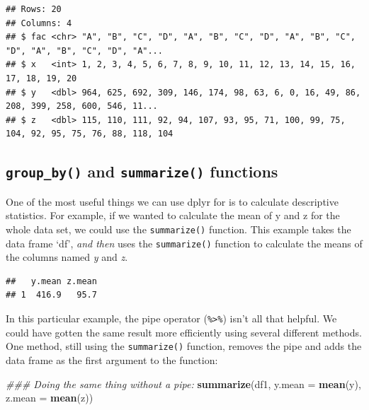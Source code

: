 \documentclass[letterpaper,]{book}
\newenvironment{Shaded}{\begin{snugshade}}{\end{snugshade}}
\newcommand{\CommentTok}[1]{\textcolor[rgb]{0.56,0.35,0.01}{\textit{#1}}}
\newcommand{\DataTypeTok}[1]{\textcolor[rgb]{0.13,0.29,0.53}{#1}}
\newcommand{\KeywordTok}[1]{\textcolor[rgb]{0.13,0.29,0.53}{\textbf{#1}}}
\newcommand{\NormalTok}[1]{#1}
\newcommand{\OperatorTok}[1]{\textcolor[rgb]{0.81,0.36,0.00}{\textbf{#1}}}
\newcommand{\StringTok}[1]{\textcolor[rgb]{0.31,0.60,0.02}{#1}}
\begin{document}
\begin{verbatim}
## Rows: 20
## Columns: 4
## $ fac <chr> "A", "B", "C", "D", "A", "B", "C", "D", "A", "B", "C", "D", "A", "B", "C", "D", "A"...
## $ x   <int> 1, 2, 3, 4, 5, 6, 7, 8, 9, 10, 11, 12, 13, 14, 15, 16, 17, 18, 19, 20
## $ y   <dbl> 964, 625, 692, 309, 146, 174, 98, 63, 6, 0, 16, 49, 86, 208, 399, 258, 600, 546, 11...
## $ z   <dbl> 115, 110, 111, 92, 94, 107, 93, 95, 71, 100, 99, 75, 104, 92, 95, 75, 76, 88, 118, 104
\end{verbatim}

\hypertarget{group_by-and-summarize-functions}{%
\subsection{\texorpdfstring{\texttt{group\_by()} and \texttt{summarize()} functions}{group\_by() and summarize() functions}}\label{group_by-and-summarize-functions}}

One of the most useful things we can use dplyr for is to calculate descriptive statistics. For example, if we wanted to calculate the mean of y and z for the whole data set, we could use the \texttt{summarize()} function. This example takes the data frame `df', \emph{and then} uses the \texttt{summarize()} function to calculate the means of the columns named \emph{y} and \emph{z}.

\begin{Shaded}
\end{Shaded}

\begin{verbatim}
##   y.mean z.mean
## 1  416.9   95.7
\end{verbatim}

In this particular example, the pipe operator (\texttt{\%\textgreater{}\%}) isn't all that helpful. We could have gotten the same result more efficiently using several different methods. One method, still using the \texttt{summarize()} function, removes the pipe and adds the data frame as the first argument to the function:

\begin{Shaded}
\begin{Highlighting}[]
\CommentTok{### Doing the same thing without a pipe:}
\KeywordTok{summarize}\NormalTok{(df1, }
          \DataTypeTok{y.mean =} \KeywordTok{mean}\NormalTok{(y),}
          \DataTypeTok{z.mean =} \KeywordTok{mean}\NormalTok{(z))}
\end{Highlighting}
\end{Shaded}
\end{document}
